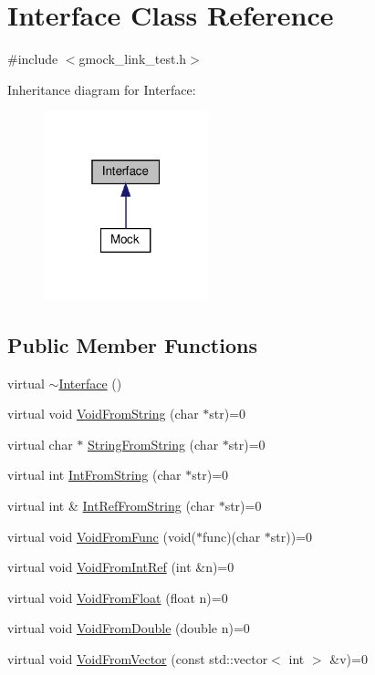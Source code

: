 \hypertarget{class_interface}{}\section{Interface Class Reference}
\label{class_interface}


{\ttfamily \#include $<$gmock\+\_\+link\+\_\+test.\+h$>$}



Inheritance diagram for Interface\+:
\nopagebreak
\begin{figure}[H]
\begin{center}
\leavevmode
\includegraphics[width=135pt]{class_interface__inherit__graph}
\end{center}
\end{figure}
\subsection*{Public Member Functions}
\begin{DoxyCompactItemize}
\item 
virtual \hyperlink{class_interface_a67eca71a4ef8d28dc959dd495e2b2b59}{$\sim$\+Interface} ()
\item 
virtual void \hyperlink{class_interface_a65d6ae604e7e9a513aec72c9c94e0b97}{Void\+From\+String} (char $\ast$str)=0
\item 
virtual char $\ast$ \hyperlink{class_interface_a756b1d22c12aa3f14a5083f90043fbf0}{String\+From\+String} (char $\ast$str)=0
\item 
virtual int \hyperlink{class_interface_ab34c8a5fd2236a6b009f86a4e5851b61}{Int\+From\+String} (char $\ast$str)=0
\item 
virtual int \& \hyperlink{class_interface_ab93276de67e60c44fd775d4c139aa8e1}{Int\+Ref\+From\+String} (char $\ast$str)=0
\item 
virtual void \hyperlink{class_interface_a7dab3c82b857a9a5f52b3ce6f7df547f}{Void\+From\+Func} (void($\ast$func)(char $\ast$str))=0
\item 
virtual void \hyperlink{class_interface_aa43fb56650a57b6b3e7743e54e50cb86}{Void\+From\+Int\+Ref} (int \&n)=0
\item 
virtual void \hyperlink{class_interface_ae2b3e9411c893a45642d3af632752c66}{Void\+From\+Float} (float n)=0
\item 
virtual void \hyperlink{class_interface_aa56524017aabdbe46510648c711ab8a8}{Void\+From\+Double} (double n)=0
\item 
virtual void \hyperlink{class_interface_ae84fe7e53f881db2f823ad35d004927a}{Void\+From\+Vector} (const std\+::vector$<$ int $>$ \&v)=0
\end{DoxyCompactItemize}


